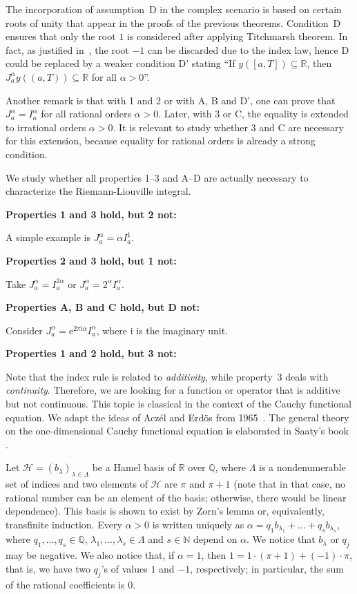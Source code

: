 \documentclass[12pt,reqno]{amsart}
\theoremstyle{plain}
\numberwithin{equation}{section} %
\begin{document}
The incorporation of assumption~D in the complex scenario is based on certain roots of unity that appear in the proofs of the previous theorems. Condition~D ensures that only the root $1$ is considered after applying Titchmarsh theorem. In fact, as justified in~\cite{cao_jie}, the root $-1$ can be discarded due to the index law, hence D could be replaced by a weaker condition D' stating ``If $y([a,T])\subseteq \mathbb{R}$, then $J_a^\alpha y((a,T))\subseteq\mathbb{R}$ for all $\alpha>0$''.

Another remark is that with 1 and 2 or with A, B and D', one can prove that $J_a^\alpha=I_a^\alpha$ for all rational orders $\alpha>0$. Later, with 3 or C, the equality is extended to irrational orders $\alpha>0$. It is relevant to study whether 3 and C are necessary for this extension, because equality for rational orders is already a strong condition.

We study whether all properties 1--3 and A--D are actually necessary to characterize the Riemann-Liouville integral. 

\noindent
\textbf{Properties 1 and 3 hold, but 2 not:}

A simple example is $J_a^\alpha = \alpha I_a^1$.

\noindent
\textbf{Properties 2 and 3 hold, but 1 not:}

Take $J_a^\alpha= I_a^{2\alpha}$ or $J_a^\alpha=2^\alpha  I_a^{\alpha}$.

\noindent
\textbf{Properties A, B and C hold, but D not:}

Consider $J_a^\alpha=\mathrm{e}^{2\pi \mathrm{i}\alpha}  I_a^{\alpha}$, where $\mathrm{i}$ is the imaginary unit.

\noindent
\textbf{Properties 1 and 2 hold, but 3 not:}

Note that the index rule is related to \textit{additivity}, while property~3 deals with \textit{continuity}. Therefore, we are looking for a function or operator that is additive but not continuous. This topic is classical in the context of the Cauchy functional equation. We adapt the ideas of Acz\'el and Erd\"os from 1965~\cite{aczel}. The general theory on the one-dimensional Cauchy functional equation is elaborated in Saaty's book \cite[Chapter~3]{saaty}.

Let $\mathcal{H}=(b_\lambda)_{\lambda\in\Lambda}$ be a Hamel basis of $\mathbb{R}$ over $\mathbb{Q}$, where $\Lambda$ is a nondenumerable set of indices and two elements of $\mathcal{H}$ are $\pi$ and $\pi+1$ (note that in that case, no rational number can be an element of the basis; otherwise, there would be linear dependence). This basis is shown to exist by Zorn's lemma or, equivalently, transfinite induction. Every $\alpha>0$ is written uniquely as $\alpha=q_1b_{\lambda_1}+\ldots+q_s b_{\lambda_s}$, where $q_1,\ldots,q_s\in\mathbb{Q}$, $\lambda_1,\ldots,\lambda_s\in\Lambda$ and $s\in\mathbb{N}$ depend on $\alpha$. We notice that $b_\lambda$ or $q_j$ may be negative. We also notice that, if $\alpha=1$, then $1=1\cdot (\pi+1)+(-1)\cdot \pi$, that is, we have two $q_j$'s of values $1$ and $-1$, respectively; in particular, the sum of the rational coefficients is $0$.
\end{document}
